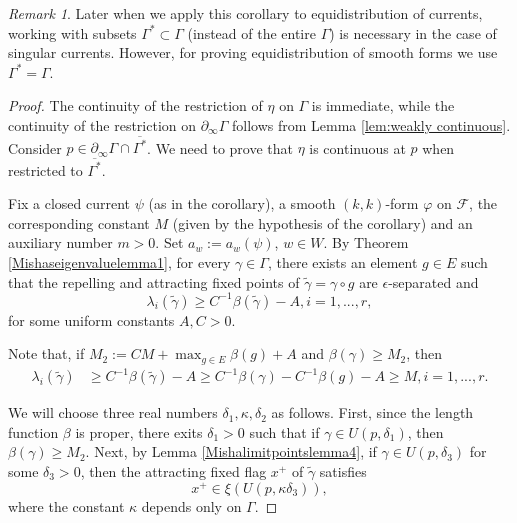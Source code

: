 \documentclass[12pt]{amsbook}%
\theoremstyle{definition}
\theoremstyle{remark}
\newtheorem{rem}[thm]{Remark}
\numberwithin{section}{chapter}
\numberwithin{subsection}{section}
\numberwithin{figure}{chapter}
\def\dyl{>0}
\def\cF{{\mathscr{F}}}
\def\tga{{\tilde{\gamma}}}
\def\Ga{\Gamma}
\def\geo{\partial_\infty}
\def\zhao{\color{red}}
\begin{document}
{{%
\begin{rem} 
Later when we apply this corollary to equidistribution of currents, working with subsets $\Ga^*\subset \Ga$ (instead of the entire $\Ga$) 
is necessary in the case of singular currents. However, for proving equidistribution of smooth forms we use $\Ga^*=\Ga$.
\end{rem}




\begin{proof}
The continuity of the restriction of $\eta$ on $\Gamma$ is immediate, while the continuity of the restriction  on $\geo \Gamma$ follows from Lemma \ref{lem:weakly continuous}. Consider 
$p\in \geo \Gamma\cap \overline{\Gamma^*}$. We need to prove that $\eta$ is continuous at $p$ 
when restricted to $\overline{\Gamma^*}$. 

Fix a closed current $\psi$ (as in the corollary), a smooth $(k,k)$-form  $\varphi$ on $\cF$, the corresponding constant $M$ (given by the hypothesis of the corollary) and an auxiliary number $m> 0$. Set $a_w:= a_w(\psi)$, $w\in W$. 
By Theorem \ref{Mishaseigenvaluelemma1}, for every $\gamma \in \Gamma$, there exists an element $g\in E$ such that the repelling and attracting fixed points  
of $\tilde{\gamma} = \gamma \circ g$ are $\epsilon$-separated and   
\begin{equation*}
 \lambda_i (\tilde{\gamma}) \geqslant C^{-1} \beta ({\tilde{\gamma}}) - A, i=1,...,r, 
\end{equation*}
for some uniform constants $A,C>0$. 



Note that, if $M_2:=C M  + \max_{g\in E} \beta(g) + A $ and 
$\beta(\gamma) \geqslant M_2$,  then 
\begin{align*}
\lambda_i(\tilde{\gamma}) &\geqslant C^{-1} \beta(\tilde{\gamma}) - A 
 \geqslant C^{-1} \beta(\gamma) - C^{-1} \beta(g) -A  \geqslant M, i=1,...,r. 
\end{align*}

We will choose three real numbers $\delta_1,\kappa,\delta_2$ as follows. 
First, since the length function $\beta$ is proper, there exits $\delta_1>0$ such that if 
$\gamma \in U(p,\delta_1)$, then $\beta(\gamma)\geqslant M_2$. 
Next, by Lemma \ref{Mishalimitpointslemma4}, if $\gamma \in U(p,\delta_3)$ for some 
$\delta_3\dyl$, then the attracting fixed flag $x^+$ of $\tga$ satisfies 
$$
x^+\in \xi(U(p,\kappa \delta_3)),$$ 
where the constant $\kappa$ depends only on $\Gamma$. 



\end{proof}}}
\end{document}
